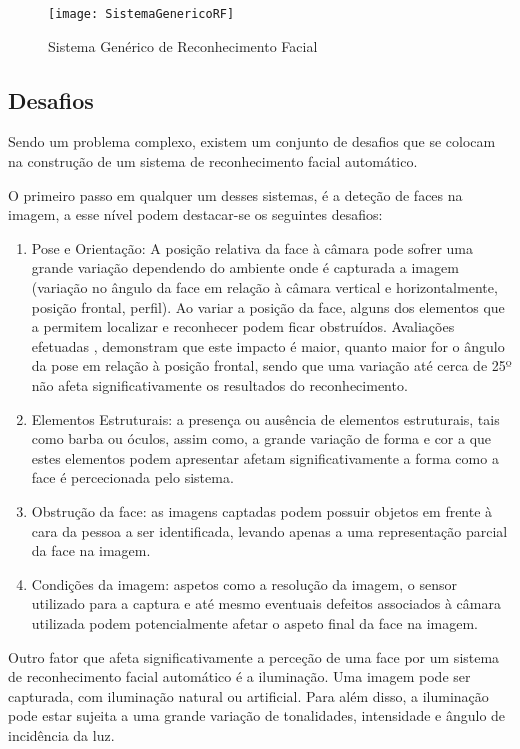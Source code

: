 \begin{figure}[t]
  \begin{center}
    \leavevmode
    \texttt{[image: SistemaGenericoRF]}
    \caption{Sistema Genérico de Reconhecimento Facial}
    \label{fig:genericRF}
  \end{center}
\end{figure}

\subsection{Desafios} \label{desafios}
Sendo um problema complexo, existem um conjunto de desafios que se colocam na construção de um sistema de reconhecimento facial automático. 

O primeiro passo em qualquer um desses sistemas, é a deteção de faces na imagem, a esse nível podem destacar-se os seguintes desafios\citep{Yang2002}:
\begin{enumerate}
\item Pose e Orientação: A posição relativa da face à câmara pode sofrer uma grande variação dependendo do ambiente onde é capturada a imagem (variação no ângulo da face em relação à câmara vertical e horizontalmente, posição frontal, perfil). Ao variar a posição da face, alguns dos elementos que a permitem localizar e reconhecer podem ficar obstruídos. Avaliações efetuadas \citep{BlackburnDuaneM.;BoneMike;Phillips2001}, demonstram que este impacto é maior, quanto maior for o ângulo da pose em relação à posição frontal, sendo que uma variação até cerca de 25º não afeta significativamente os resultados do reconhecimento.
\item  Elementos Estruturais: a presença ou ausência de elementos estruturais, tais como barba ou óculos, assim como, a grande variação de forma e cor a que estes elementos podem apresentar afetam significativamente a forma como a face é percecionada pelo sistema.
\item Obstrução da face: as imagens captadas podem possuir objetos em frente à cara da pessoa a ser identificada, levando apenas a uma representação parcial da face na imagem.
\item Condições da imagem: aspetos como a resolução da imagem, o sensor utilizado para a captura e até mesmo eventuais defeitos associados à câmara utilizada podem potencialmente afetar o aspeto final da face na imagem.
\end{enumerate}

Outro fator que afeta significativamente a perceção de uma face por um sistema de reconhecimento facial automático é a iluminação. Uma imagem pode ser capturada, com iluminação natural ou artificial. Para além disso, a iluminação pode estar sujeita a uma grande variação de tonalidades, intensidade e ângulo de incidência da luz.

